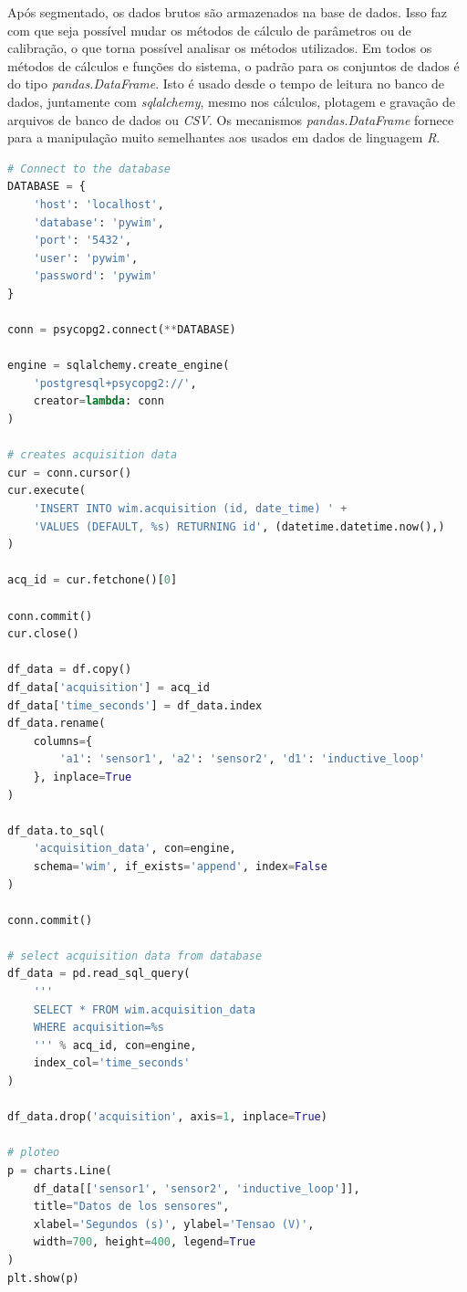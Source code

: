 \documentclass{ufscThesis}
\begin{document}
Após segmentado, os dados brutos são armazenados na base de dados. Isso faz com que seja possível mudar os métodos de cálculo de parâmetros ou de calibração, o que torna possível analisar os métodos utilizados.
Em todos os métodos de cálculos e funções do sistema, o padrão para os conjuntos de dados é do tipo \textit{pandas.DataFrame}. Isto é usado desde o tempo de leitura no banco de dados, juntamente com \textit{sqlalchemy}, mesmo nos cálculos, plotagem e gravação de arquivos de banco de dados ou \textit{CSV}. Os mecanismos \textit{pandas.DataFrame} fornece para a manipulação muito semelhantes aos usados em dados de linguagem \textit{R}.

\begin{lstlisting}[language=Python, caption=Armazenamento e consulta na base de datos, label={lst:bd}]
# Connect to the database
DATABASE = {
    'host': 'localhost',
    'database': 'pywim',
    'port': '5432',
    'user': 'pywim',
    'password': 'pywim'
}

conn = psycopg2.connect(**DATABASE)

engine = sqlalchemy.create_engine(
    'postgresql+psycopg2://',
    creator=lambda: conn
)

# creates acquisition data
cur = conn.cursor()
cur.execute(
    'INSERT INTO wim.acquisition (id, date_time) ' +
    'VALUES (DEFAULT, %s) RETURNING id', (datetime.datetime.now(),)
)

acq_id = cur.fetchone()[0]

conn.commit()
cur.close()

df_data = df.copy()
df_data['acquisition'] = acq_id
df_data['time_seconds'] = df_data.index
df_data.rename(
    columns={
        'a1': 'sensor1', 'a2': 'sensor2', 'd1': 'inductive_loop'
    }, inplace=True
)

df_data.to_sql(
    'acquisition_data', con=engine, 
    schema='wim', if_exists='append', index=False
)

conn.commit()

# select acquisition data from database
df_data = pd.read_sql_query(
    '''
    SELECT * FROM wim.acquisition_data
    WHERE acquisition=%s
    ''' % acq_id, con=engine,
    index_col='time_seconds'
)

df_data.drop('acquisition', axis=1, inplace=True)

# ploteo
p = charts.Line(
    df_data[['sensor1', 'sensor2', 'inductive_loop']], 
    title="Datos de los sensores", 
    xlabel='Segundos (s)', ylabel='Tensao (V)', 
    width=700, height=400, legend=True
)
plt.show(p)

\end{lstlisting}
\end{document}
